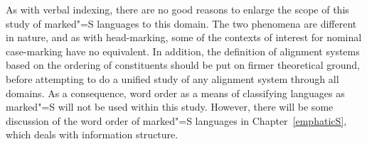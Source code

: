 As with verbal indexing, there are no good reasons to enlarge the scope of this study of marked"=S languages to this domain.
The two phenomena are different in nature, and as with head-marking, some of the contexts of interest for nominal case-marking have no equivalent.
In addition, the definition of alignment systems based on the ordering of constituents should be put on firmer theoretical ground, before attempting to do a unified study of any alignment system through all domains. 
As a consequence, word order as a means of classifying languages as marked"=S will not be used within this study. 
However, there will be some discussion of the word order of marked"=S languages in Chapter~\ref{emphaticS}, which deals with information structure.  


